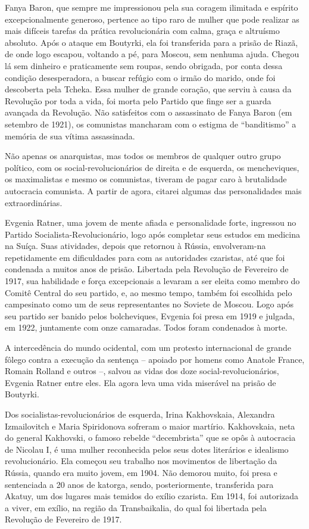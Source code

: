 Fanya Baron, que sempre me impressionou pela sua coragem ilimitada e
espírito excepcionalmente generoso, pertence ao tipo raro de mulher que
pode realizar as mais difíceis tarefas da prática revolucionária com
calma, graça e altruísmo absoluto. Após o ataque em Boutyrki, ela foi
transferida para a prisão de Riazã, de onde logo escapou, voltando a pé,
para Moscou, sem nenhuma ajuda. Chegou lá sem dinheiro e praticamente
sem roupas, sendo obrigada, por conta dessa condição desesperadora, a
buscar refúgio com o irmão do marido, onde foi descoberta pela Tcheka.
Essa mulher de grande coração, que serviu à causa da Revolução por toda
a vida, foi morta pelo Partido que finge ser a guarda avançada da
Revolução. Não satisfeitos com o assassinato de Fanya Baron (em setembro
de 1921), os comunistas mancharam com o estigma de ``banditismo'' a
memória de sua vítima assassinada.

Não apenas os anarquistas, mas todos os membros de qualquer outro grupo
político, com os social-revolucionários de direita e de esquerda, os
mencheviques, os maximalistas e mesmo os comunistas, tiveram de pagar
caro à brutalidade autocracia comunista. A partir de agora, citarei
algumas das personalidades mais extraordinárias.

Evgenia Ratner, uma jovem de mente afiada e personalidade forte,
ingressou no Partido Socialista-Revolucionário, logo após completar seus
estudos em medicina na Suíça. Suas atividades, depois que retornou à
Rússia, envolveram-na repetidamente em dificuldades para com as
autoridades czaristas, até que foi condenada a muitos anos de prisão.
Libertada pela Revolução de Fevereiro de 1917, sua habilidade e força
excepcionais a levaram a ser eleita como membro do Comitê Central do seu
partido, e, ao mesmo tempo, também foi escolhida pelo campesinato como
um de seus representantes no Soviete de Moscou. Logo após seu partido
ser banido pelos bolcheviques, Evgenia foi presa em 1919 e julgada, em
1922, juntamente com onze camaradas. Todos foram condenados à morte.

A intercedência do mundo ocidental, com um protesto internacional de
grande fôlego contra a execução da sentença -- apoiado por homens como
Anatole France, Romain Rolland e outros --, salvou as vidas dos doze
social-revolucionários, Evgenia Ratner entre eles. Ela agora leva uma
vida miserável na prisão de Boutyrki.

Dos socialistas-revolucionários de esquerda, Irina Kakhovskaia,
Alexandra Izmailovitch e Maria Spiridonova sofreram o maior martírio.
Kakhovskaia, neta do general Kakhovski, o famoso rebelde ``decembrista''
que se opôs à autocracia de Nicolau I, é uma mulher reconhecida pelos
seus dotes literários e idealismo revolucionário. Ela começou seu
trabalho nos movimentos de libertação da Rússia, quando era muito jovem,
em 1904. Não demorou muito, foi presa e sentenciada a 20 anos de
katorga, sendo, posteriormente, transferida para Akatuy, um dos lugares
mais temidos do exílio czarista. Em 1914, foi autorizada a viver, em
exílio, na região da Transbaikalia, do qual foi libertada pela Revolução
de Fevereiro de 1917.

